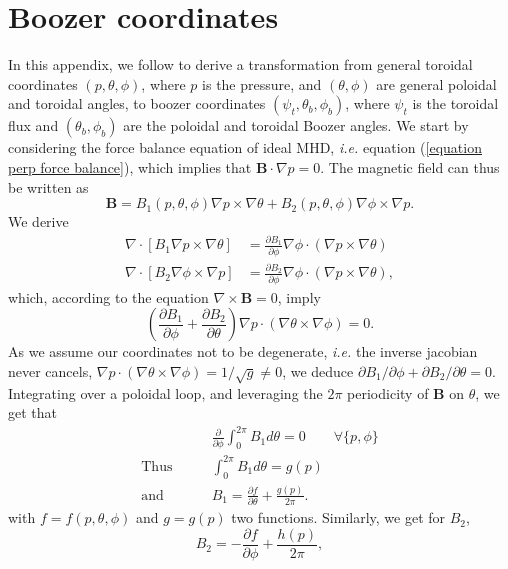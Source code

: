 \chapter{Boozer coordinates}
\label{appendix boozer coordinates}
In this appendix, we follow \citet{Helander2014} to derive a transformation from general toroidal coordinates $(p,\theta,\phi)$, where $p$ is the pressure, and $(\theta,\phi)$ are general poloidal and toroidal angles, to boozer coordinates $(\psi_t,\theta_b,\phi_b)$, where $\psi_t$ is the toroidal flux and $(\theta_b,\phi_b)$ are the poloidal and toroidal Boozer angles. We start by considering the force balance equation of ideal MHD, \textit{i.e.} equation (\ref{equation perp force balance}), which implies that $\mathbf{B}\cdot\nabla p =0$. The magnetic field can thus be written as
\begin{equation}
	\mathbf{B} = B_1(p,\theta,\phi)\nabla p\times\nabla\theta + B_2(p,\theta,\phi)\nabla\phi\times\nabla p.
\end{equation}
We derive 
\begin{align}
	\nabla\cdot[B_1\nabla p \times\nabla\theta] &= \frac{\partial B_1}{\partial \phi}\nabla\phi\cdot(\nabla p \times\nabla\theta)\\
	\nabla\cdot[B_2\nabla\phi\times\nabla p] &= \frac{\partial B_2}{\partial \phi}\nabla\phi\cdot(\nabla p \times\nabla\theta),
\end{align}
which, according to the equation $\nabla\times\mathbf{B}=0$, imply
\begin{equation}
	\left(\frac{\partial B_1}{\partial\phi}+\frac{\partial B_2}{\partial \theta}\right) \nabla p \cdot(\nabla\theta\times\nabla\phi)=0.
\end{equation}
As we assume our coordinates not to be degenerate, \textit{i.e.} the inverse jacobian never cancels, $\nabla p \cdot(\nabla\theta\times\nabla\phi) = 1/\sqrt{g} \neq 0$, we deduce $\partial B_1/\partial\phi + \partial B_2/\partial\theta =0$. Integrating over a poloidal loop, and leveraging the $2\pi$ periodicity of $\mathbf{B}$ on $\theta$, we get that
\begin{align}
	{}&\frac{\partial}{\partial\phi} \int_0^{2\pi} B_1d\theta =0\qquad\forall\{p,\phi\}\\
	\text{Thus}\qquad &\int_0^{2\pi}B_1 d\theta = g(p)\\
	\text{and}\qquad&B_1=\frac{\partial f}{\partial\theta} + \frac{g(p)}{2\pi}.
\end{align}
with $f=f(p,\theta,\phi)$ and $g=g(p)$ two functions. Similarly, we get for $B_2$,
\begin{equation}
	B_2 = -\frac{\partial f}{\partial \phi} + \frac{h(p)}{2\pi},
\end{equation}
